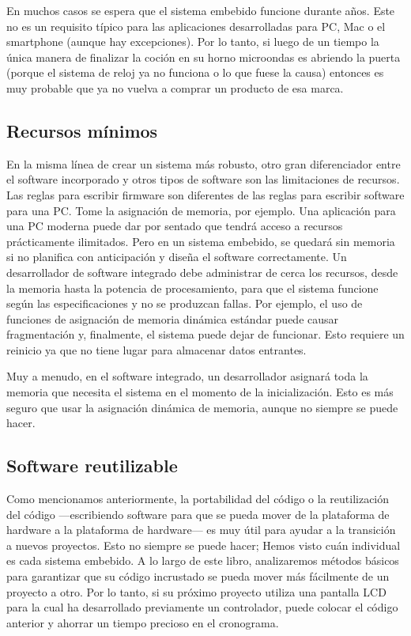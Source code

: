 \documentclass[output=paper, 
colorlinks,
citecolor=brown,
newtxmath
]{langscibook}
\begin{document}
En muchos casos se espera que el sistema embebido funcione durante años.
Este no es un requisito típico para las aplicaciones desarrolladas para PC, Mac o el smartphone (aunque hay excepciones).
Por lo tanto, si luego de un tiempo la única manera de finalizar la
coción en su horno microondas es abriendo la puerta (porque el sistema de reloj ya no funciona
o lo que fuese la causa) entonces es muy probable
que ya no vuelva a comprar un producto de esa marca.





\subsection {Recursos mínimos}

En la misma línea de crear un sistema más robusto, otro gran diferenciador entre el software incorporado y otros tipos de software son las limitaciones de recursos. Las reglas para escribir firmware son diferentes de las reglas para escribir software para una PC. Tome la asignación de memoria, por ejemplo. Una aplicación para una PC moderna puede dar por sentado que tendrá acceso a recursos prácticamente ilimitados. Pero en un sistema embebido, se quedará sin memoria si no planifica con anticipación y diseña el software correctamente.
Un desarrollador de software integrado debe administrar de cerca los recursos, desde la memoria hasta la potencia de procesamiento, para que el sistema funcione según las especificaciones y no se produzcan fallas. Por ejemplo, el uso de funciones de asignación de memoria dinámica estándar puede causar fragmentación y, finalmente, el sistema puede dejar de funcionar. Esto requiere un reinicio ya que no tiene lugar para almacenar datos entrantes.

Muy a menudo, en el software integrado, un desarrollador asignará toda la memoria que necesita el sistema en el momento de la inicialización. Esto es más seguro que usar la asignación dinámica de memoria, aunque no siempre se puede hacer.




\subsection {Software reutilizable}

Como mencionamos anteriormente, la portabilidad del código o la reutilización del código —escribiendo software para que se pueda mover de la plataforma de hardware a la plataforma de hardware— es muy útil para ayudar a la transición a nuevos proyectos. Esto no siempre se puede hacer; Hemos visto cuán individual es cada sistema embebido. A lo largo de este libro, analizaremos métodos básicos para garantizar que su código incrustado se pueda mover más fácilmente de un proyecto a otro. Por lo tanto, si su próximo proyecto utiliza una pantalla LCD para la cual ha desarrollado previamente un controlador, puede colocar el código anterior y ahorrar un tiempo precioso en el cronograma.
\end{document}
